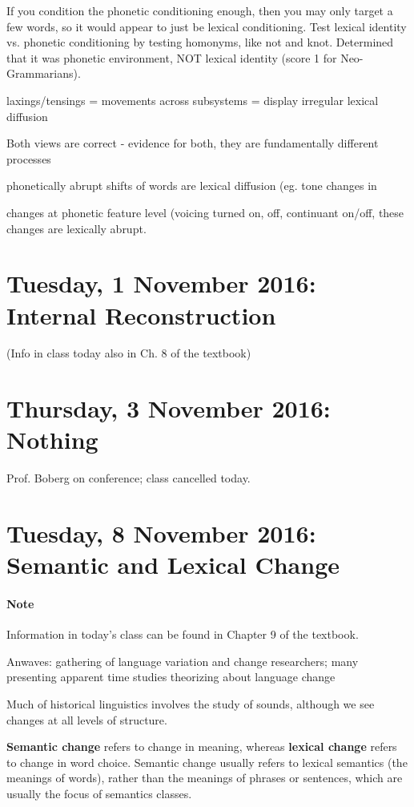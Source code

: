 \documentclass{exam}
\begin{document}
If you condition the phonetic conditioning enough, then you may only target a few words, so it would appear to just be lexical conditioning.  Test lexical identity vs. phonetic conditioning by testing homonyms, like not and knot. Determined that it was phonetic environment, NOT lexical identity (score 1 for Neo-Grammarians). 

laxings/tensings = movements across subsystems = display irregular lexical diffusion

Both views are correct - evidence for both, they are fundamentally different processes

phonetically abrupt shifts of words are lexical diffusion (eg. tone changes in 

changes at phonetic feature level (voicing turned on, off, continuant on/off, these changes are lexically abrupt. 

\section*{Tuesday, 1 November 2016: Internal Reconstruction}

(Info in class today also in Ch. 8 of the textbook)

\section*{Thursday, 3 November 2016: Nothing}

Prof. Boberg on conference; class cancelled today.  

\section*{Tuesday, 8 November 2016: Semantic and Lexical Change}

\paragraph*{Note} Information in today's class can be found in Chapter 9 of the textbook. 

Anwaves: gathering of language variation and change researchers; many presenting apparent time studies \+ theorizing about language change

Much of historical linguistics involves the study of sounds, although we see changes at all levels of structure. 

\textbf{Semantic change} refers to change in meaning, whereas \textbf{lexical change} refers to change in word choice. 
Semantic change usually refers to lexical semantics (the meanings of words), rather than the meanings of phrases or sentences, which are usually the focus of semantics classes. 
\end{document}
